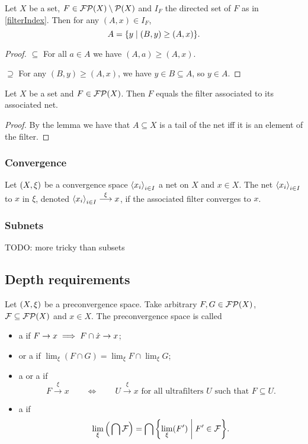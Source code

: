 \begin{lemma} \label{tailsFilterIndex}
Let $X$ be a set, $F\in\operatorname{\mathcal{FP}}(X)\setminus\operatorname{\mathcal{P}}(X)$ and $I_F$ the directed set of $F$ as in \ref{filterIndex}. Then for any $(A,x)\in I_F$,
\[ A = \setbuilder{y}{(B,y) \geq (A,x)}. \]
\end{lemma}
\begin{proof}
$\boxed{\subseteq}$ For all $a\in A$ we have $(A,a)\geq (A,x)$.

$\boxed{\supseteq}$ For any $(B,y) \geq (A,x)$, we have $y\in B\subseteq A$, so $y\in A$.
\end{proof}
\begin{corollary}
Let $X$ be a set and $F\in\operatorname{\mathcal{FP}}(X)$. Then $F$ equals the filter associated to its associated net.
\end{corollary}
\begin{proof}
By the lemma we have that $A\subseteq X$ is a tail of the net iff it is an element of the filter.
\end{proof}

\subsubsection{Convergence}
\begin{definition}
Let $\sSet{X,\xi}$ be a convergence space $\left\langle x_i \right\rangle_{i\in I}$ a net on $X$ and $x\in X$. The net $\left\langle x_i \right\rangle_{i\in I}$  to $x$ in $\xi$, denoted $\left\langle x_i \right\rangle_{i\in I} \overset{\xi}{\longrightarrow} x$, if the associated filter converges to $x$.
\end{definition}


\subsubsection{Subnets}
TODO: more tricky than subsets

\subsection{Depth requirements}
\begin{definition}
Let $\sSet{X,\xi}$ be a preconvergence space. Take arbitrary $F,G \in \operatorname{\mathcal{FP}}(X)$, $\mathcal{F}\subseteq \operatorname{\mathcal{FP}}(X)$ and $x\in X$. The preconvergence space is called
\begin{itemize}
\item a  if $F \to x \implies F\cap \dot{x} \to x$;
\item {} or a  if $\lim_\xi(F\cap G) = \lim_\xi F \cap \lim_\xi G$;
\item a  or a  if
\[ F\overset{\xi}{\longrightarrow} x \qquad\iff\qquad \text{$U\overset{\xi}{\longrightarrow} x$ for all ultrafilters $U$ such that $F\subseteq U$.} \]
\item a  if 
\[ \lim_\xi\Big(\bigcap \mathcal{F}\Big) = \bigcap \setbuilder{\lim_\xi(F')}{F'\in \mathcal{F}}. \]
\end{itemize}
\end{definition}

